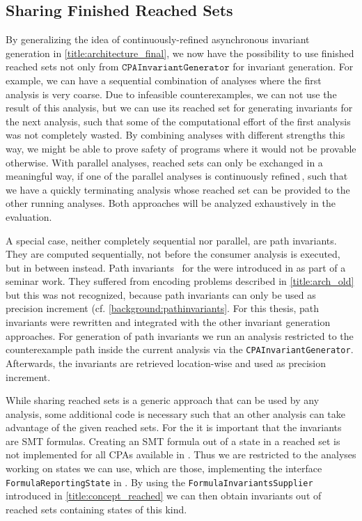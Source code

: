 \subsection{Sharing Finished Reached Sets}\label{title:sharingReached}
By generalizing the idea of continuously-refined asynchronous invariant generation in \autoref{title:architecture_final}, we now have the possibility to use finished reached sets not only from $\mathtt{CPAInvariantGenerator}$ for 
invariant generation. For example, we can have a sequential combination of analyses where the first analysis is very coarse. Due to infeasible counterexamples, we can not use the result of this 
analysis, but we can use its reached set for generating invariants for the next analysis, such that some of the computational effort of the first analysis was not completely wasted. By combining 
analyses with different strengths this way, we might be able to prove safety of programs where it would not be provable otherwise.
With parallel analyses, reached sets can only be exchanged in a meaningful way, if one of the parallel analyses is continuously refined\,, 
such that we have a quickly terminating analysis whose reached set can be provided to the other running analyses. Both approaches will be analyzed exhaustively in the evaluation.

A special case, neither completely sequential nor parallel, are path invariants. They are computed sequentially, not before the consumer analysis is executed, but in between instead. Path 
invariants~\cite{Beyer:PathInvariants} for the \PredicateCPA{} were introduced in \CPAchecker{} as part of a 
seminar work. They suffered from encoding problems described in \autoref{title:arch_old} but this was not recognized, because path invariants can only be used as precision increment (cf. 
\autoref{background:pathinvariants}. For this thesis, path invariants were rewritten and integrated with the other invariant generation approaches. For generation of path invariants we run an analysis 
restricted to the counterexample path inside the current analysis via the \texttt{CPAInvariantGenerator}. Afterwards, the invariants are retrieved location-wise and used as precision increment.


While sharing reached sets is a generic approach that can be used by any analysis, some additional code is necessary such that an other analysis can take advantage of the given reached sets. For 
the \PredicateCPA{} it is important that the invariants are \ac{SMT} formulas. Creating an \ac{SMT} formula out of a state in a reached set is not implemented for all \acp{CPA} available in \CPAchecker{}. Thus we are restricted to the analyses working on states we can use, which are those, implementing the interface \texttt{FormulaReportingState} in \CPAchecker{}.
By using the \texttt{FormulaInvariantsSupplier} introduced in \autoref{title:concept_reached} we can then obtain invariants out of reached sets containing states of this kind.


